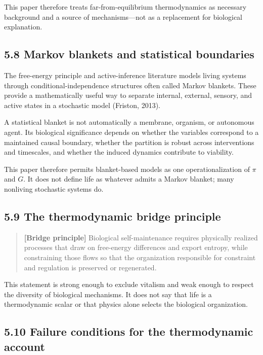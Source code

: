 \documentclass[
  11pt,
]{article}
\begin{document}
This paper therefore treats far-from-equilibrium thermodynamics as
necessary background and a source of mechanisms---not as a replacement
for biological explanation.

\subsection{5.8 Markov blankets and statistical
boundaries}\label{markov-blankets-and-statistical-boundaries}

The free-energy principle and active-inference literature models living
systems through conditional-independence structures often called Markov
blankets. These provide a mathematically useful way to separate
internal, external, sensory, and active states in a stochastic model
(Friston, 2013).

A statistical blanket is not automatically a membrane, organism, or
autonomous agent. Its biological significance depends on whether the
variables correspond to a maintained causal boundary, whether the
partition is robust across interventions and timescales, and whether the
induced dynamics contribute to viability.

This paper therefore permits blanket-based models as one
operationalization of \(\pi\) and \(G\). It does not define life as
whatever admits a Markov blanket; many nonliving stochastic systems do.

\subsection{5.9 The thermodynamic bridge
principle}\label{the-thermodynamic-bridge-principle}

\begin{quote}
\textbf{{[}Bridge principle{]}} Biological self-maintenance requires
physically realized processes that draw on free-energy differences and
export entropy, while constraining those flows so that the organization
responsible for constraint and regulation is preserved or regenerated.
\end{quote}

This statement is strong enough to exclude vitalism and weak enough to
respect the diversity of biological mechanisms. It does not say that
life is a thermodynamic scalar or that physics alone selects the
biological organization.

\subsection{5.10 Failure conditions for the thermodynamic
account}\label{failure-conditions-for-the-thermodynamic-account}
\end{document}
